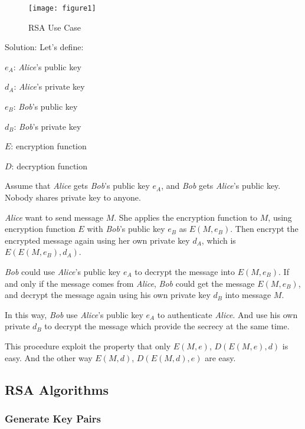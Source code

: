 \documentclass[twoside]{article}
\begin{document}
\begin{figure}[ht!]
\centering
    \texttt{[image: figure1]}
\caption{RSA Use Case\label{p1}}
\end{figure}


Solution:
Let's define:

$e_A$: \textit{Alice}'s public key

$d_A$: \textit{Alice}'s private key

$e_B$: \textit{Bob}'s public key

$d_B$: \textit{Bob}'s private key

$E$: encryption function

$D$: decryption function

Assume that \textit{Alice} gets \textit{Bob}'s public key $e_A$,
and \textit{Bob} gets \textit{Alice}'s public key. Nobody shares private key to anyone.

\textit{Alice} want to send message $M$. She applies the encryption function to $M$,
using encryption function $E$ with \textit{Bob}'s public key $e_B$
as $E(M, e_B)$. Then encrypt the encrypted message again using her own private key
$d_A$, which is $E(E(M, e_B), d_A)$.

\textit{Bob} could use \textit{Alice}'s public key $e_A$ to decrypt the message into
$E(M, e_B)$. If and only if the message comes from \textit{Alice}, \textit{Bob} could
get the message $E(M, e_B)$, and decrypt the message again using his own private key
$d_B$ into message $M$.

In this way, \textit{Bob} use \textit{Alice}'s public key $e_A$ to authenticate 
\textit{Alice}. And use his own private $d_B$ to decrypt the message which 
provide the secrecy at the same time.

This procedure exploit the property that only $E(M, e)$, $D(E(M, e), d)$ is easy. 
And the other way $E(M, d)$, $D(E(M, d), e)$ are easy.

\subsection{RSA Algorithms}

\subsubsection{Generate Key Pairs}
\end{document}
